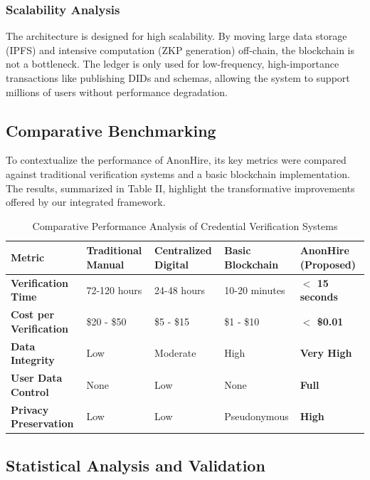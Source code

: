\documentclass[conference]{IEEEtran}
\begin{document}
\subsubsection{Scalability Analysis}

The architecture is designed for high scalability. By moving large data storage (IPFS) and intensive computation (ZKP generation) off-chain, the blockchain is not a bottleneck. The ledger is only used for low-frequency, high-importance transactions like publishing DIDs and schemas, allowing the system to support millions of users without performance degradation.

\subsection{Comparative Benchmarking}

To contextualize the performance of AnonHire, its key metrics were compared against traditional verification systems and a basic blockchain implementation. The results, summarized in Table II, highlight the transformative improvements offered by our integrated framework.

\begin{table}[ht]
\caption{Comparative Performance Analysis of Credential Verification Systems}
\label{tab:comparison}
\centering
\footnotesize
\begin{tabular}{|p{2.2cm}|p{3.2cm}|p{3.2cm}|p{3.2cm}|p{3.2cm}|}
\hline
\textbf{Metric} & \textbf{Traditional Manual} & \textbf{Centralized Digital} & \textbf{Basic Blockchain} & \textbf{AnonHire (Proposed)} \\
\hline
\textbf{Verification Time} & 72-120 hours  & 24-48 hours & 10-20 minutes & \textbf{$<$ 15 seconds} \\
\hline
\textbf{Cost per Verification} & \$20 - \$50 & \$5 - \$15 & \$1 - \$10 & \textbf{$<$ \$0.01} \\
\hline
\textbf{Data Integrity} & Low & Moderate & High & \textbf{Very High} \\
\hline
\textbf{User Data Control} & None & Low & None & \textbf{Full} \\
\hline
\textbf{Privacy Preservation} & Low & Low & Pseudonymous & \textbf{High} \\
\hline
\end{tabular}
\end{table}

\subsection{Statistical Analysis and Validation}
\end{document}
